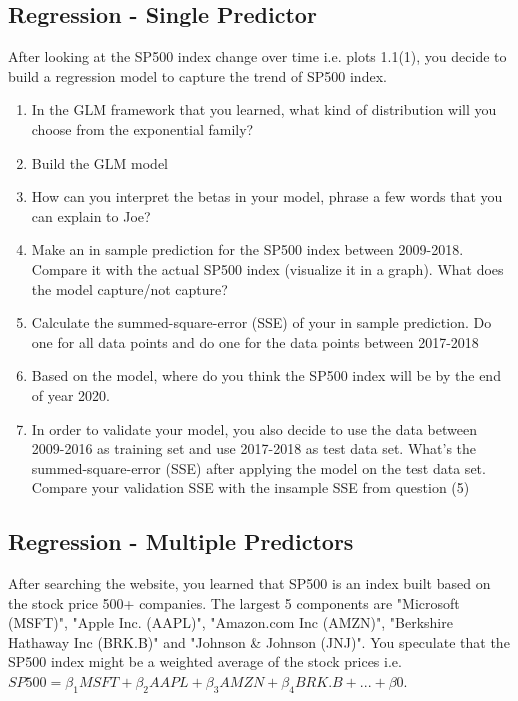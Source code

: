 \documentclass{article}
\begin{document}
\subsection{Regression - Single Predictor}

After looking at the SP500 index change over time i.e. plots 1.1(1), you decide to build a regression model to capture the trend of SP500 index. 
\begin{enumerate}[(1)]
\item In the GLM framework that you learned, what kind of distribution will you choose from the exponential family?
\item Build the GLM model
\item How can you interpret the betas in your model, phrase a few words that you can explain to Joe?
\item Make an in sample prediction for the SP500 index between 2009-2018. Compare it with the actual SP500 index (visualize it in a graph). What does the model capture/not capture?
\item Calculate the summed-square-error (SSE) of your in sample prediction. Do one for all data points and do one for the data points between 2017-2018
\item Based on the model, where do you think the SP500 index will be by the end of year 2020.
\item In order to validate your model, you also decide to use the data between 2009-2016 as training set and use 2017-2018 as test data set. What's the summed-square-error (SSE) after applying the model on the test data set. Compare your validation SSE with the insample SSE from question (5)
\end{enumerate}

\subsection{Regression - Multiple Predictors}
After searching the website, you learned that SP500 is an index built based on the stock price 500+ companies. The largest 5 components are "Microsoft (MSFT)", "Apple Inc. (AAPL)", "Amazon.com Inc (AMZN)", "Berkshire Hathaway Inc (BRK.B)" and "Johnson \& Johnson (JNJ)". You speculate that the SP500 index might be a weighted average of the stock prices i.e. $SP500=\beta_1MSFT+\beta_2AAPL+\beta_3AMZN+\beta_4BRK.B+...+\beta0$. 
\end{document}
